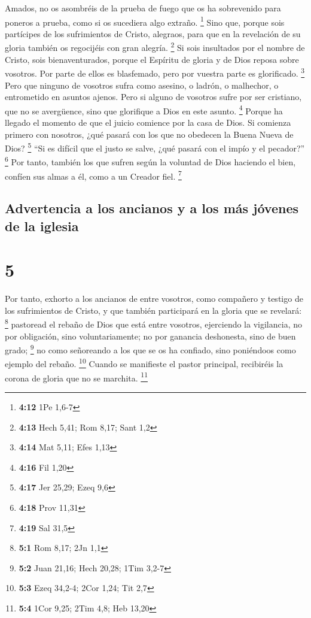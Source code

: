  Amados, no os asombréis de la prueba de fuego que os ha
sobrevenido para poneros a prueba, como si os sucediera algo extraño.
\footnote{\textbf{4:12} 1Pe 1,6-7}  Sino que, porque sois
partícipes de los sufrimientos de Cristo, alegraos, para que en la
revelación de su gloria también os regocijéis con gran alegría.
\footnote{\textbf{4:13} Hech 5,41; Rom 8,17; Sant 1,2} 
Si sois insultados por el nombre de Cristo, sois bienaventurados, porque
el Espíritu de gloria y de Dios reposa sobre vosotros. Por parte de
ellos es blasfemado, pero por vuestra parte es glorificado. \footnote{\textbf{4:14}
  Mat 5,11; Efes 1,13}  Pero que ninguno de vosotros
sufra como asesino, o ladrón, o malhechor, o entrometido en asuntos
ajenos.  Pero si alguno de vosotros sufre por ser
cristiano, que no se avergüence, sino que glorifique a Dios en este
asunto. \footnote{\textbf{4:16} Fil 1,20}  Porque ha
llegado el momento de que el juicio comience por la casa de Dios. Si
comienza primero con nosotros, ¿qué pasará con los que no obedecen la
Buena Nueva de Dios? \footnote{\textbf{4:17} Jer 25,29; Ezeq 9,6}
 ``Si es difícil que el justo se salve, ¿qué pasará con
el impío y el pecador?'' \footnote{\textbf{4:18} Prov 11,31}
 Por tanto, también los que sufren según la voluntad de
Dios haciendo el bien, confíen sus almas a él, como a un Creador fiel.
\footnote{\textbf{4:19} Sal 31,5}

\hypertarget{advertencia-a-los-ancianos-y-a-los-muxe1s-juxf3venes-de-la-iglesia}{%
\subsection{Advertencia a los ancianos y a los más jóvenes de la
iglesia}\label{advertencia-a-los-ancianos-y-a-los-muxe1s-juxf3venes-de-la-iglesia}}

\hypertarget{section-4}{%
\section{5}\label{section-4}}

 Por tanto, exhorto a los ancianos de entre vosotros, como
compañero y testigo de los sufrimientos de Cristo, y que también
participará en la gloria que se revelará: \footnote{\textbf{5:1} Rom
  8,17; 2Jn 1,1}  pastoread el rebaño de Dios que está
entre vosotros, ejerciendo la vigilancia, no por obligación, sino
voluntariamente; no por ganancia deshonesta, sino de buen grado;
\footnote{\textbf{5:2} Juan 21,16; Hech 20,28; 1Tim 3,2-7}
 no como señoreando a los que se os ha confiado, sino
poniéndoos como ejemplo del rebaño. \footnote{\textbf{5:3} Ezeq 34,2-4;
  2Cor 1,24; Tit 2,7}  Cuando se manifieste el pastor
principal, recibiréis la corona de gloria que no se marchita.
\footnote{\textbf{5:4} 1Cor 9,25; 2Tim 4,8; Heb 13,20}

